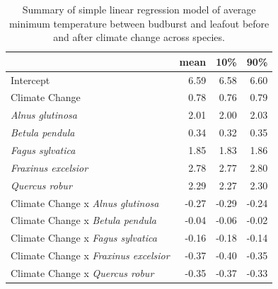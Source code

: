 \documentclass{article}\usepackage[]{graphicx}\usepackage[]{color}
\begin{document}
\begin{table}[H]
\centering
\caption{Summary of simple linear regression model of average minimum temperature between budburst and leafout before and after climate change across species.} 
\label{tab:simptmin}
\begin{tabular}{lrrr}
  \hline
 & mean & 10\% & 90\% \\ 
  \hline
Intercept & 6.59 & 6.58 & 6.60 \\ 
  Climate Change & 0.78 & 0.76 & 0.79 \\ 
  \textit{Alnus glutinosa} & 2.01 & 2.00 & 2.03 \\ 
  \textit{Betula pendula} & 0.34 & 0.32 & 0.35 \\ 
  \textit{Fagus sylvatica} & 1.85 & 1.83 & 1.86 \\ 
  \textit{Fraxinus excelsior} & 2.78 & 2.77 & 2.80 \\ 
  \textit{Quercus robur} & 2.29 & 2.27 & 2.30 \\ 
  Climate Change x \textit{Alnus glutinosa} & -0.27 & -0.29 & -0.24 \\ 
  Climate Change x \textit{Betula pendula} & -0.04 & -0.06 & -0.02 \\ 
  Climate Change x \textit{Fagus sylvatica} & -0.16 & -0.18 & -0.14 \\ 
  Climate Change x \textit{Fraxinus excelsior} & -0.37 & -0.40 & -0.35 \\ 
  Climate Change x \textit{Quercus robur} & -0.35 & -0.37 & -0.33 \\ 
   \hline
\end{tabular}
\end{table}
\end{document}
